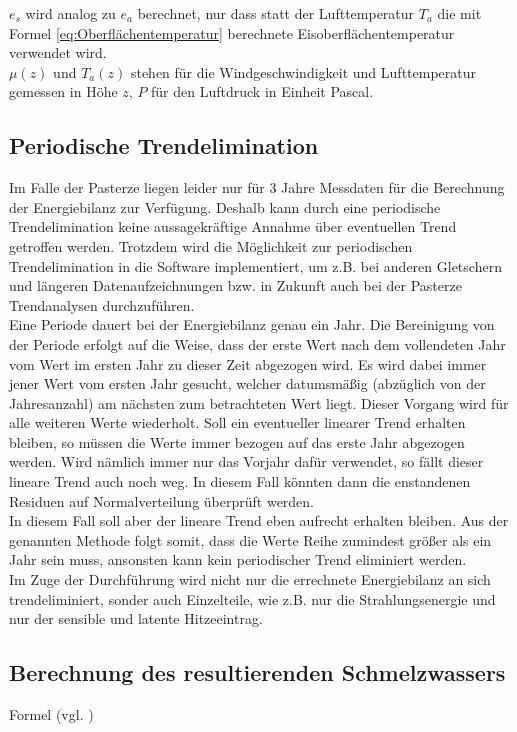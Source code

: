 \documentclass[12pt,a4paper]{article}
\begin{document}
$e_s$ wird analog zu $e_a$ berechnet, nur dass statt der Lufttemperatur $T_a$ die mit Formel \ref{eq:Oberflächentemperatur} berechnete Eisoberflächentemperatur verwendet wird.\\
$\mu(z)$ und $T_a(z)$ stehen für die Windgeschwindigkeit und Lufttemperatur gemessen in Höhe $z$, $P$ für den Luftdruck in Einheit Pascal.


\subsection{Periodische Trendelimination}\label{Periodische Trendelimination}
Im Falle der Pasterze liegen leider nur für 3 Jahre Messdaten für die Berechnung der Energiebilanz zur Verfügung. Deshalb kann durch eine periodische Trendelimination keine aussagekräftige Annahme über eventuellen Trend getroffen werden. Trotzdem wird die Möglichkeit zur periodischen Trendelimination in die Software implementiert, um z.B. bei anderen Gletschern und längeren Datenaufzeichnungen bzw. in Zukunft auch bei der Pasterze Trendanalysen durchzuführen.\\

Eine Periode dauert bei der Energiebilanz genau ein Jahr. Die Bereinigung von der Periode erfolgt auf die Weise, dass der erste Wert nach dem vollendeten Jahr vom Wert im ersten Jahr zu dieser Zeit abgezogen wird. Es wird dabei immer jener Wert vom ersten Jahr gesucht, welcher datumsmäßig (abzüglich von der Jahresanzahl) am nächsten zum betrachteten Wert liegt. Dieser Vorgang wird für alle weiteren Werte wiederholt. Soll ein eventueller linearer Trend erhalten bleiben, so müssen die Werte immer bezogen auf das erste Jahr abgezogen werden. Wird nämlich immer nur das Vorjahr dafür verwendet, so fällt dieser lineare Trend auch noch weg. In diesem Fall könnten dann die enstandenen Residuen auf Normalverteilung überprüft werden.\\
In diesem Fall soll aber der lineare Trend eben aufrecht erhalten bleiben. Aus der genannten Methode folgt somit, dass die Werte Reihe zumindest größer als ein Jahr sein muss, ansonsten kann kein periodischer Trend eliminiert werden.\\

Im Zuge der Durchführung wird nicht nur die errechnete Energiebilanz an sich trendeliminiert, sonder auch Einzelteile, wie z.B. nur die Strahlungsenergie und nur der sensible und latente Hitzeeintrag.


\subsection{Berechnung des resultierenden Schmelzwassers}
Formel (vgl. \cite[142]{ThePhysicsOfGlaciers})
\end{document}
